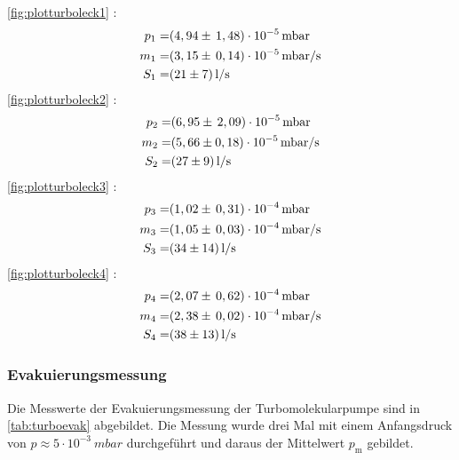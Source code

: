 \noindent
\autoref{fig:plotturboleck1} :
	\begin{align*}
		p_1=& (4,94 \pm \, 1,48)\cdot 10^{-5} \, \si{mbar}\\
		m_1=& (3,15 \pm \, 0,14)\cdot 10^{-5} \, \si{mbar/s}\\
		S_1=& \SI{21 \pm 7}{l/s}
	\end{align*}
\autoref{fig:plotturboleck2} :
	\begin{align*}
		p_2=& (6,95 \pm \, 2,09)\cdot 10^{-5} \, \si{mbar}\\
		m_2=& (5,66 \pm 0,18)\cdot 10^{-5} \, \si{mbar/s}\\
		S_2=& \SI{27 \pm 9}{l/s}
	\end{align*}
\autoref{fig:plotturboleck3} :
	\begin{align*}
		p_3=& (1,02 \pm \, 0,31)\cdot 10^{-4} \, \si{mbar}\\
		m_3=& (1,05 \pm \, 0,03)\cdot 10^{-4} \, \si{mbar/s}\\
		S_3=& \SI{34 \pm 14}{l/s}
	\end{align*}
\autoref{fig:plotturboleck4} :
	\begin{align*}
		p_4=& (2,07 \pm \, 0,62)\cdot 10^{-4} \, \si{mbar}\\
		m_4=& (2,38 \pm \, 0,02)\cdot 10^{-4} \, \si{mbar/s}\\
		S_4=& \SI{38 \pm 13}{l/s}
  \end{align*}




\subsubsection{Evakuierungsmessung}

Die Messwerte der Evakuierungsmessung der Turbomolekularpumpe sind in \autoref{tab:turboevak} abgebildet. Die Messung wurde drei Mal mit einem Anfangsdruck
von $p \approx 5 \cdot 10^{-3} \: \si{mbar}$ durchgeführt und daraus der Mittelwert $p_{\text{m}}$ gebildet.

